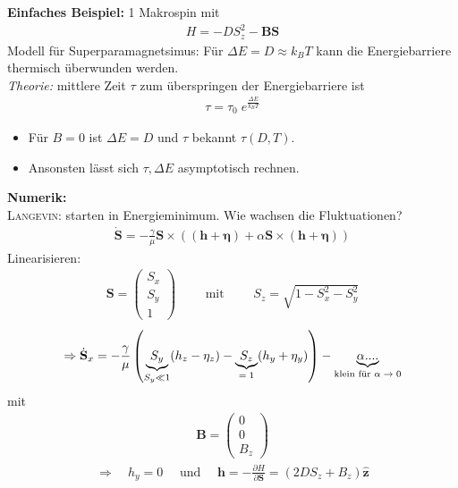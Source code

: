 \documentclass[12pt]{article}
\begin{document}
   \textbf{Einfaches Beispiel:} 1 Makrospin mit 
   \begin{align*}
   H = -D S_z^2 - \mathbf{B} \mathbf{S}
   \end{align*}
   Modell für Superparamagnetsimus: Für $\Delta E = D \approx k_B T$ kann die Energiebarriere thermisch überwunden werden. \\
   \textit{Theorie:} mittlere Zeit $\tau$ zum überspringen der Energiebarriere ist 
\begin{align*}
\tau = \tau_0 \; e^\frac{\Delta E}{k_B T}
\end{align*}   
  \begin{itemize}
   \item Für $B=0$ ist $\Delta E = D$ und $\tau $ bekannt $\tau (D, T)$. 
    \item Ansonsten lässt sich $\tau, \Delta E$ asymptotisch rechnen.
    \end{itemize}
    \textbf{Numerik:} \\
    \textsc{Langevin:} starten in Energieminimum. Wie wachsen die Fluktuationen?
    \begin{align}
    \dot{\mathbf{S}} = - \frac{\gamma}{\mu} \mathbf{S} \times \left( ( \mathbf{h} +  \mathbf{\eta}) + \alpha  \mathbf{S} \times ( \mathbf{h} +  \mathbf{\eta}) \right)
    \end{align}
    Linearisieren:
    \begin{align}
     \mathbf{S} = \begin{pmatrix}S_x\\ S_y \\ 1 \end{pmatrix} \qquad \text{ mit } \qquad S_z = \sqrt{1- S_x^2 - S_y^2}
    \end{align}
    \begin{align}
    \Rightarrow \dot{\mathbf{S}}_x = - \frac{\gamma }{\mu} \left(
    \underbrace{ S_y}_{ S_y \ll 1} ( h_z - \eta_z ) - \underbrace{S_z}_\text{$=1$} (h_y + \eta_y) \right) - \underbrace{\alpha....}_\text{klein für $ \alpha \to 0$}
    \end{align}
    mit
    \begin{align}
    \mathbf{B} = \begin{pmatrix} 0 \\ 0 \\ B_z \end{pmatrix} \end{align}
    \begin{align}
     \Rightarrow \quad  h_y = 0 \quad \mbox{ und } \quad \mathbf{h}= - \frac{\partial H}{\partial \mathbf{S}}= (2 DS_z + B_z) \hat{\mathbf{z}}
    \end{align}
\end{document}
